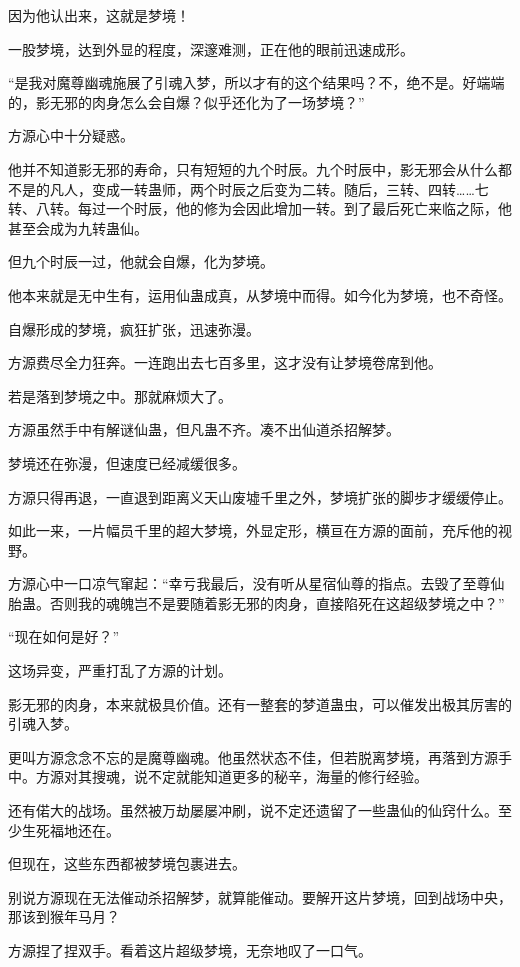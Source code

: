 \begin{this_body}
因为他认出来，这就是梦境！

一股梦境，达到外显的程度，深邃难测，正在他的眼前迅速成形。

“是我对魔尊幽魂施展了引魂入梦，所以才有的这个结果吗？不，绝不是。好端端的，影无邪的肉身怎么会自爆？似乎还化为了一场梦境？”

方源心中十分疑惑。

他并不知道影无邪的寿命，只有短短的九个时辰。九个时辰中，影无邪会从什么都不是的凡人，变成一转蛊师，两个时辰之后变为二转。随后，三转、四转……七转、八转。每过一个时辰，他的修为会因此增加一转。到了最后死亡来临之际，他甚至会成为九转蛊仙。

但九个时辰一过，他就会自爆，化为梦境。

他本来就是无中生有，运用仙蛊成真，从梦境中而得。如今化为梦境，也不奇怪。

自爆形成的梦境，疯狂扩张，迅速弥漫。

方源费尽全力狂奔。一连跑出去七百多里，这才没有让梦境卷席到他。

若是落到梦境之中。那就麻烦大了。

方源虽然手中有解谜仙蛊，但凡蛊不齐。凑不出仙道杀招解梦。

梦境还在弥漫，但速度已经减缓很多。

方源只得再退，一直退到距离义天山废墟千里之外，梦境扩张的脚步才缓缓停止。

如此一来，一片幅员千里的超大梦境，外显定形，横亘在方源的面前，充斥他的视野。

方源心中一口凉气窜起：“幸亏我最后，没有听从星宿仙尊的指点。去毁了至尊仙胎蛊。否则我的魂魄岂不是要随着影无邪的肉身，直接陷死在这超级梦境之中？”

“现在如何是好？”

这场异变，严重打乱了方源的计划。

影无邪的肉身，本来就极具价值。还有一整套的梦道蛊虫，可以催发出极其厉害的引魂入梦。

更叫方源念念不忘的是魔尊幽魂。他虽然状态不佳，但若脱离梦境，再落到方源手中。方源对其搜魂，说不定就能知道更多的秘辛，海量的修行经验。

还有偌大的战场。虽然被万劫屡屡冲刷，说不定还遗留了一些蛊仙的仙窍什么。至少生死福地还在。

但现在，这些东西都被梦境包裹进去。

别说方源现在无法催动杀招解梦，就算能催动。要解开这片梦境，回到战场中央，那该到猴年马月？

方源捏了捏双手。看着这片超级梦境，无奈地叹了一口气。


\end{this_body}
